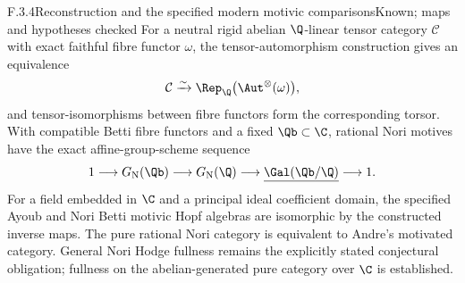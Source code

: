 \begin{result}{F.3.4}{Reconstruction and the specified modern motivic comparisons}{Known; maps and hypotheses checked}
For a neutral rigid abelian $\Q$-linear tensor category $\mathcal C$ with exact faithful fibre functor $\omega$, the tensor-automorphism construction gives an equivalence
\[
 \mathcal C\xrightarrow{\sim}\Rep_\Q\bigl(\Aut^\otimes(\omega)\bigr),
\]
and tensor-isomorphisms between fibre functors form the corresponding torsor. With compatible Betti fibre functors and a fixed $\Qb\subset\C$, rational Nori motives have the exact affine-group-scheme sequence
\[
 1\longrightarrow G_{\mathrm N}(\Qb)
 \longrightarrow G_{\mathrm N}(\Q)
 \longrightarrow\underline{\Gal(\Qb/\Q)}\longrightarrow1.
\]
For a field embedded in $\C$ and a principal ideal coefficient domain, the specified Ayoub and Nori Betti motivic Hopf algebras are isomorphic by the constructed inverse maps. The pure rational Nori category is equivalent to Andre's motivated category. General Nori Hodge fullness remains the explicitly stated conjectural obligation; fullness on the abelian-generated pure category over $\C$ is established.
\end{result}
